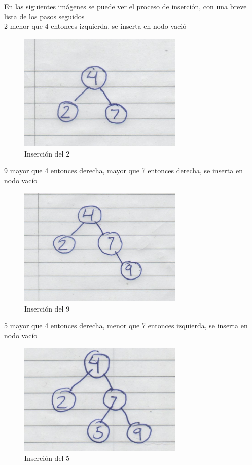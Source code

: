 En las siguientes imágenes se puede ver el proceso de inserción, con una breve lista de los pasos seguidos
\\
2 menor que 4 entonces izquierda, se inserta en nodo vació
\begin{figure}[H]
	\centering
	\includegraphics[width=0.7\textwidth]{./images/imagen3.jpg}
	\caption{Inserción del 2}
\end{figure} 
9 mayor que 4 entonces derecha, mayor que 7 entonces derecha, se inserta en nodo vacío
\begin{figure}[H]
	\centering
	\includegraphics[width=0.7\textwidth]{./images/imagen4.jpg}
	\caption{Inserción del 9}
\end{figure}
5 mayor que 4 entonces derecha, menor que 7 entonces izquierda, se inserta en nodo vacío
\begin{figure}[H]
	\centering
	\includegraphics[width=0.7\textwidth]{./images/imagen5.jpg}
	\caption{Inserción del 5}
\end{figure} 
